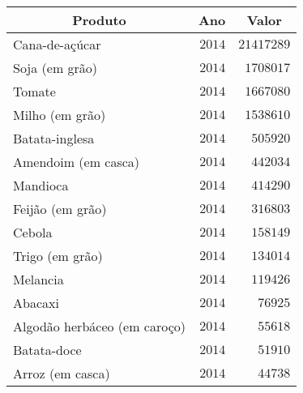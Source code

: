 \begin{table}[!tbp]
\begin{center}
\begin{tabular}{lrr}
\hline\hline
\multicolumn{1}{c}{Produto}&\multicolumn{1}{c}{Ano}&\multicolumn{1}{c}{Valor}\tabularnewline
\hline
Cana-de-açúcar&$2014$&$21417289$\tabularnewline
Soja (em grão)&$2014$&$ 1708017$\tabularnewline
Tomate&$2014$&$ 1667080$\tabularnewline
Milho (em grão)&$2014$&$ 1538610$\tabularnewline
Batata-inglesa&$2014$&$  505920$\tabularnewline
Amendoim (em casca)&$2014$&$  442034$\tabularnewline
Mandioca&$2014$&$  414290$\tabularnewline
Feijão (em grão)&$2014$&$  316803$\tabularnewline
Cebola&$2014$&$  158149$\tabularnewline
Trigo (em grão)&$2014$&$  134014$\tabularnewline
Melancia&$2014$&$  119426$\tabularnewline
Abacaxi&$2014$&$   76925$\tabularnewline
Algodão herbáceo (em caroço)&$2014$&$   55618$\tabularnewline
Batata-doce&$2014$&$   51910$\tabularnewline
Arroz (em casca)&$2014$&$   44738$\tabularnewline
\hline
\end{tabular}\end{center}

\end{table}

